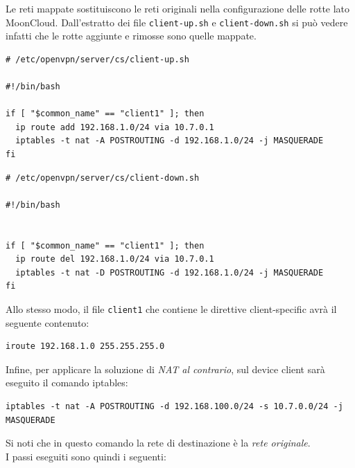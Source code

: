		
	Le reti mappate sostituiscono le reti originali nella configurazione delle rotte lato
	MoonCloud. Dall'estratto dei file \texttt{client-up.sh} e
	\texttt{client-down.sh} si può vedere infatti che le rotte aggiunte e rimosse sono
	quelle mappate.
\begin{verbatim}
# /etc/openvpn/server/cs/client-up.sh
				
#!/bin/bash
				
if [ "$common_name" == "client1" ]; then
  ip route add 192.168.1.0/24 via 10.7.0.1
  iptables -t nat -A POSTROUTING -d 192.168.1.0/24 -j MASQUERADE
fi
\end{verbatim}
\begin{verbatim}
# /etc/openvpn/server/cs/client-down.sh
				
#!/bin/bash
				
				
if [ "$common_name" == "client1" ]; then
  ip route del 192.168.1.0/24 via 10.7.0.1
  iptables -t nat -D POSTROUTING -d 192.168.1.0/24 -j MASQUERADE
fi
\end{verbatim}
	Allo stesso modo, il file \texttt{client1} che contiene le direttive client-specific
	avrà il seguente contenuto:
\begin{verbatim}
iroute 192.168.1.0 255.255.255.0
\end{verbatim}
	Infine, per applicare la soluzione di \textit{NAT al contrario}, sul device client
	sarà eseguito il comando iptables:
\begin{verbatim}
iptables -t nat -A POSTROUTING -d 192.168.100.0/24 -s 10.7.0.0/24 -j MASQUERADE
\end{verbatim}
	Si noti che in questo comando la rete di destinazione è la \textit{rete originale}.\\
	I passi eseguiti sono quindi i seguenti:
